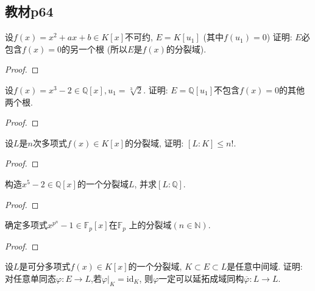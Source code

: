 \subsection{教材p64}

\begin{problem}
    设$f(x) = x^2 + ax + b \in K[x]$不可约, $E = K[u_1]$
(其中$f(u_1) = 0$) 证明: $E$必包含$f(x) = 0$的另一个根
(所以$E$是$f(x)$的分裂域).
\end{problem}

\begin{proof}
    
\end{proof}

\begin{problem}
    设$f(x) = x^3 - 2 \in \mathbb{Q}[x], u_1 = \sqrt[3]{2}$.
证明: $E = \mathbb{Q}[u_1]$不包含$f(x) = 0$的其他两个根.
\end{problem}

\begin{proof}
    
\end{proof}

\begin{problem}
    设$L$是$n$次多项式$f(x) \in K[x]$的分裂域, 证明: 
$[L:K] \leqslant n!$.
\end{problem}

\begin{proof}
    
\end{proof}

\begin{problem}
    构造$x^5 - 2 \in \mathbb{Q}[x]$的一个分裂域$L$,
并求$[L:\mathbb{Q}]$.
\end{problem}

\begin{proof}
    
\end{proof}

\begin{problem}
    确定多项式$x^{p^n} - 1 \in \mathbb{F}_p[x]$在$\mathbb{F}_p$
上的分裂域$(n \in \mathbb{N})$.
\end{problem}

\begin{proof}
    
\end{proof}

\begin{problem}
    设$L$是可分多项式$f(x) \in K[x]$的一个分裂域, $K \subset E \subset L$是任意中间域.
证明: 对任意单同态$\varphi:E \to L$,若$\varphi|_K = \mathrm{id}_K$,
则$\varphi$一定可以延拓成域同构$\overline\varphi:L \to L$.
\end{problem}

